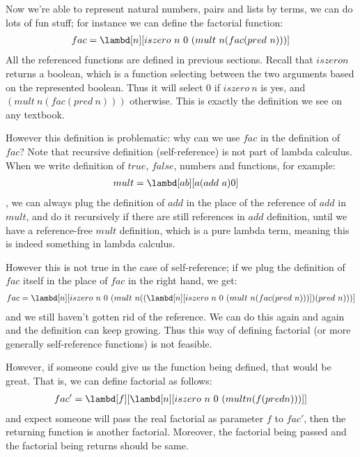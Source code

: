 \documentclass[../../../include/open-logic-section]{subfiles}
\begin{document}


Now we're able to represent natural numbers, pairs and
lists by terms, we can do lots of fun stuff; for instance we can
define the factorial function:
\begin{align*}
  fac = \lambd[n][iszero ~ n ~ 0 ~ (mult ~ n (fac (pred ~ n)))]
\end{align*}
All the referenced functions are defined in previous sections.
Recall that $iszero n$ returns a boolean, which is a function
selecting between the two arguments based on the represented boolean.
Thus it will select $0$ if $iszero ~ n$ is yes, and $(mult ~ n (fac
(pred ~ n)))$ otherwise. This is exactly the definition we see on any
textbook.

However this definition is problematic: why can we use $fac$ in the
definition of $fac$? Note that recursive definition (self-reference)
is not part of lambda calculus. When we write definition of $true$,
$false$, numbers and functions, for example:
\begin{align*}
    {mult} &= \lambd[ab][a (add ~ a) 0]
\end{align*}
, we can always plug the definition of $add$ in the place of the
reference of $add$ in $mult$, and do it recursively if there are still
references in $add$ definition, until we have a reference-free $mult$ definition, which
is a pure lambda term, meaning this is indeed something in lambda calculus.

However this is not true in the case of self-reference; if we plug the
definition of $fac$ itself in the place of $fac$ in the right hand, we
get:
\begin{align*}
  fac = \lambd[n][iszero ~ n ~ 0 ~ (mult ~ n ((\lambd[n][iszero ~ n ~
  0 ~ (mult ~ n (fac (pred ~ n)))]) (pred ~ n)))]
\end{align*}
and we still haven't gotten rid of the reference. We can do this again
and again and the definition can keep growing. Thus this way of
defining factorial (or more generally self-reference functions) is not
feasible.

However, if someone could give us the function being defined, that
would be great. That is, we can define factorial as follows:
\begin{align*}
  fac' = \lambd[f][\lambd[n][iszero ~ n ~ 0 ~ (mult n (f (pred n)))]]
\end{align*}
and expect someone will pass the real factorial as parameter $f$ to $fac'$, then
the returning function is another factorial. Moreover, the factorial
being passed and the factorial being returns should be same.
\end{document}
